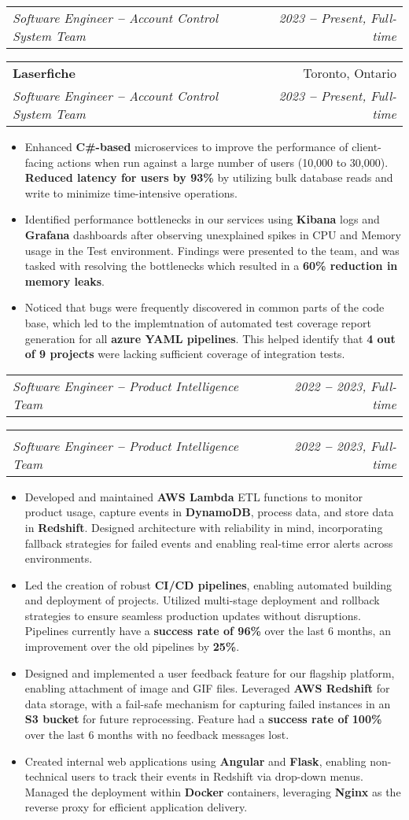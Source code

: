\documentclass[letterpaper,10pt]{article}
\makeatletter
\newcommand{\resumeItem}[1]{
  \item\small{
    {#1 \vspace{-2pt}}
  }
}
\newcommand{\resumeSubheading}[4]{
  \vspace{-2pt}\item
    \ifthenelse{\equal{#1}{}}
    {
    \begin{tabular*}{0.97\textwidth}[t]{l@{\extracolsep{\fill}}r}
      \textit{\small#3} & \textit{\small #4} \\
    \end{tabular*}\vspace{-7pt}
    }
    {
    \begin{tabular*}{0.97\textwidth}[t]{l@{\extracolsep{\fill}}r}
      \textbf{#1} & #2 \\
      \textit{\small#3} & \textit{\small #4} \\
    \end{tabular*}\vspace{-7pt}
    }
}
\newcommand{\resumeItemListStart}{\begin{itemize}}
\newcommand{\resumeItemListEnd}{\end{itemize}\vspace{-5pt}}
\makeatother
\begin{document}
    \resumeSubheading
      {Laserfiche}{Toronto, Ontario}
      {Software Engineer \textbf{--} Account Control System Team}{2023 \textbf{--} Present, Full-time}
        \resumeItemListStart
            \resumeItem{Enhanced \textbf{C\#-based} microservices to improve the performance of client-facing actions when run against a large number of users (10,000 to 30,000). \textbf{Reduced latency for users by 93\%} by utilizing bulk database reads and write to minimize time-intensive operations.}
            \resumeItem{Identified performance bottlenecks in our services using \textbf{Kibana} logs and \textbf{Grafana} dashboards after observing unexplained spikes in CPU and Memory usage in the Test environment. Findings were presented to the team, and was tasked with resolving the bottlenecks which resulted in a \textbf{60\% reduction in memory leaks}.}
            \resumeItem{Noticed that bugs were frequently discovered in common parts of the code base, which led to the implemtnation of automated test coverage report generation for all \textbf{azure YAML pipelines}. This helped identify that \textbf{4 out of 9 projects} were lacking sufficient coverage of integration tests.}
        \resumeItemListEnd

    \resumeSubheading
      {}{}
      {Software Engineer \textbf{--} Product Intelligence Team}{2022 \textbf{--} 2023, Full-time}
        \resumeItemListStart
            \resumeItem{Developed and maintained \textbf{AWS Lambda} ETL functions to monitor product usage, capture events in \textbf{DynamoDB}, process data, and store data in \textbf{Redshift}. Designed architecture with reliability in mind, incorporating fallback strategies for failed events and enabling real-time error alerts across environments.}
            \resumeItem{Led the creation of robust \textbf{CI/CD pipelines}, enabling automated building and deployment of projects. Utilized multi-stage deployment and rollback strategies to ensure seamless production updates without disruptions. Pipelines currently have a \textbf{success rate of 96\%} over the last 6 months, an improvement over the old pipelines by \textbf{25\%}.}
            \resumeItem{Designed and implemented a user feedback feature for our flagship platform, enabling attachment of image and GIF files. Leveraged \textbf{AWS Redshift} for data storage, with a fail-safe mechanism for capturing failed instances in an \textbf{S3 bucket} for future reprocessing. Feature had a \textbf{success rate of 100\%} over the last 6 months with no feedback messages lost.}
            \resumeItem{Created internal web applications using \textbf{Angular} and \textbf{Flask}, enabling non-technical users to track their events in Redshift via drop-down menus. Managed the deployment within \textbf{Docker} containers, leveraging \textbf{Nginx} as the reverse proxy for efficient application delivery.}
        \resumeItemListEnd
\end{document}

